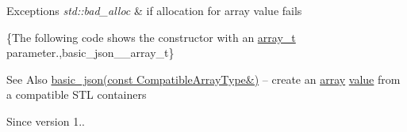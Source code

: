 \begin{DoxyExceptions}{Exceptions}
{\em std\-::bad\-\_\-alloc} & if allocation for array value fails\\
\hline
\end{DoxyExceptions}
\{The following code shows the constructor with an \hyperlink{classnlohmann_1_1basic__json_ab00b882d39306d663c23dab110f5cae0}{array\-\_\-t} parameter.,basic\-\_\-json\-\_\-\-\_\-array\-\_\-t\}

\begin{DoxySeeAlso}{See Also}
\hyperlink{classnlohmann_1_1basic__json_a81aaaab0f3b326afda2d226daab4f1e1}{basic\-\_\-json(const Compatible\-Array\-Type\&)} -- create an \hyperlink{classnlohmann_1_1basic__json_a5685815624b086caa532f41e853d4b0f}{array} \hyperlink{classnlohmann_1_1basic__json_a0a2cbbd95862a623e7dc5c37e67dead0}{value} from a compatible S\-T\-L containers
\end{DoxySeeAlso}
\begin{DoxySince}{Since}
version 1.. 
\end{DoxySince}
